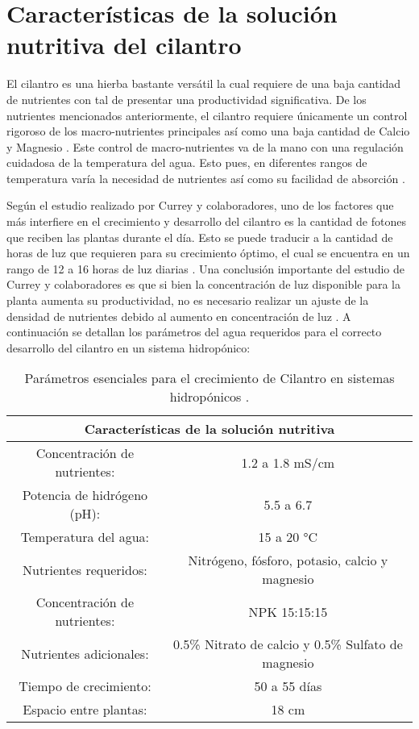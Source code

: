 \section{Características de la solución nutritiva del cilantro}
El cilantro es una hierba bastante versátil la cual requiere de una baja cantidad de nutrientes con tal de presentar una productividad significativa. De los nutrientes mencionados anteriormente, el cilantro requiere únicamente un control rigoroso de los macro-nutrientes principales así como una baja cantidad de Calcio y Magnesio \cite{letpot_nodate}. Este control de macro-nutrientes va de la mano con una regulación cuidadosa de la temperatura del agua. Esto pues, en diferentes rangos de temperatura varía la necesidad de nutrientes así como su facilidad de absorción \cite{voogt_nutrient_2019}.

Según el estudio realizado por Currey y colaboradores, uno de los factores que más interfiere en el crecimiento y desarrollo del cilantro es la cantidad de fotones que reciben las plantas durante el día. Esto se puede traducir a la cantidad de horas de luz que requieren para su crecimiento óptimo, el cual se encuentra en un rango de 12 a 16 horas de luz diarias \cite{letpot_nodate}. Una conclusión importante del estudio de Currey y colaboradores es que si bien la concentración de luz disponible para la planta aumenta su productividad, no es necesario realizar un ajuste de la densidad de nutrientes debido al aumento en concentración de luz \cite{currey_nutrient_2019}. A continuación se detallan los parámetros del agua requeridos para el correcto desarrollo del cilantro en un sistema hidropónico:

\begin{table}[H]
	\centering
	\begin{tabular}{|c|c|}
		\hline
		\multicolumn{2}{|c|}{\textbf{Características de la solución nutritiva}}\\ \hline
		Concentración de nutrientes: & 1.2 a 1.8 mS/cm \\ \hline
		Potencia de hidrógeno (pH): & 5.5 a 6.7 \\ \hline
		Temperatura del agua: & 15 a 20 °C \\ \hline
		Nutrientes requeridos: & Nitrógeno, fósforo, potasio, calcio y magnesio \\ \hline
		Concentración de nutrientes: & NPK 15:15:15\\ \hline
		Nutrientes adicionales: &  0.5\% Nitrato de calcio y 0.5\% Sulfato de magnesio\\ \hline
		Tiempo de crecimiento: & 50 a 55 días\\ \hline
		Espacio entre plantas: & 18 cm \\ \hline
	\end{tabular}
	\caption{Parámetros esenciales para el crecimiento de Cilantro en sistemas hidropónicos \cite{mondol_use_2023} \cite{letpot_nodate}.}
	\label{Cuadro0}
\end{table}

